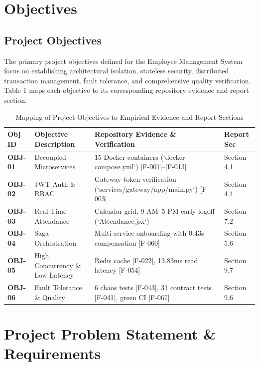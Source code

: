 \documentclass[11pt,a4paper]{article}
\begin{document}
\section{Objectives}

\subsection{Project Objectives}
The primary project objectives defined for the Employee Management System focus on establishing architectural isolation, stateless security, distributed transaction management, fault tolerance, and comprehensive quality verification. Table 1 maps each objective to its corresponding repository evidence and report section.

\begin{table}[htbp]
\caption{Mapping of Project Objectives to Empirical Evidence and Report Sections}
\centering
\begin{tabularx}{\linewidth}{l X X l}
\toprule
\textbf{Obj ID} & \textbf{Objective Description} & \textbf{Repository Evidence \& Verification} & \textbf{Report Sec} \\
\midrule
\textbf{OBJ-01} & Decoupled Microservices & 15 Docker containers (`docker-compose.yml`) [F-001]--[F-013] & Section 4.1 \\
\textbf{OBJ-02} & JWT Auth \& RBAC & Gateway token verification (`services/gateway/app/main.py`) [F-003] & Section 4.4 \\
\textbf{OBJ-03} & Real-Time Attendance & Calendar grid, 9 AM--5 PM early logoff (`Attendance.jsx`) & Section 7.2 \\
\textbf{OBJ-04} & Saga Orchestration & Multi-service onboarding with 0.43s compensation [F-060] & Section 5.6 \\
\textbf{OBJ-05} & High Concurrency \& Low Latency & Redis cache [F-022], 13.83ms read latency [F-054] & Section 9.7 \\
\textbf{OBJ-06} & Fault Tolerance \& Quality & 6 chaos tests [F-043], 31 contract tests [F-041], green CI [F-067] & Section 9.6 \\
\bottomrule
\end{tabularx}
\end{table}

\section{Project Problem Statement \& Requirements}
\end{document}
